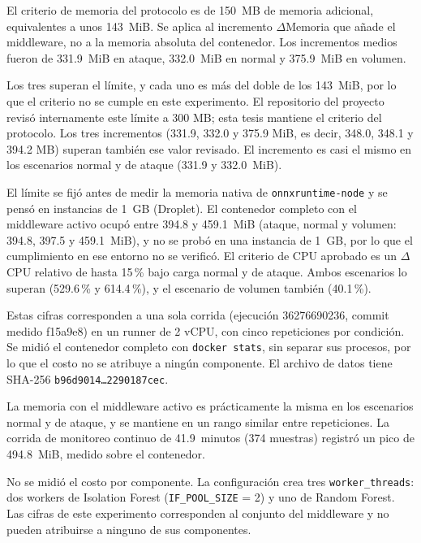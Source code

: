 El criterio de memoria del protocolo es de 150~MB de memoria adicional, equivalentes a unos 143~MiB. Se aplica al incremento $\Delta$Memoria que añade el middleware, no a la memoria absoluta del contenedor. Los incrementos medios fueron de 331.9~MiB en ataque, 332.0~MiB en normal y 375.9~MiB en volumen.

Los tres superan el límite, y cada uno es más del doble de los 143~MiB, por lo que el criterio no se cumple en este experimento. El repositorio del proyecto revisó internamente este límite a 300 MB; esta tesis mantiene el criterio del protocolo. Los tres incrementos (331.9, 332.0 y 375.9 MiB, es decir, 348.0, 348.1 y 394.2 MB) superan también ese valor revisado. El incremento es casi el mismo en los escenarios normal y de ataque (331.9 y 332.0~MiB).

El límite se fijó antes de medir la memoria nativa de \texttt{onnxruntime-node} y se pensó en instancias de 1~GB (Droplet). El contenedor completo con el middleware activo ocupó entre 394.8 y 459.1~MiB (ataque, normal y volumen: 394.8, 397.5 y 459.1~MiB), y no se probó en una instancia de 1~GB, por lo que el cumplimiento en ese entorno no se verificó. El criterio de CPU aprobado es un $\Delta$CPU relativo de hasta 15\,\% bajo carga normal y de ataque. Ambos escenarios lo superan (529.6\,\% y 614.4\,\%), y el escenario de volumen también (40.1\,\%).

Estas cifras corresponden a una sola corrida (ejecución 36276690236, commit medido f15a9e8) en un runner de 2 vCPU, con cinco repeticiones por condición. Se midió el contenedor completo con \texttt{docker stats}, sin separar sus procesos, por lo que el costo no se atribuye a ningún componente. El archivo de datos tiene SHA-256 \texttt{b96d9014\ldots 2290187cec}.

La memoria con el middleware activo es prácticamente la misma en los escenarios normal y de ataque, y se mantiene en un rango similar entre repeticiones. La corrida de monitoreo continuo de 41.9~minutos (374 muestras) registró un pico de 494.8~MiB, medido sobre el contenedor.

No se midió el costo por componente. La configuración crea tres \texttt{worker\_threads}: dos workers de Isolation Forest (\texttt{IF\_POOL\_SIZE} = 2) y uno de Random Forest. Las cifras de este experimento corresponden al conjunto del middleware y no pueden atribuirse a ninguno de sus componentes.

